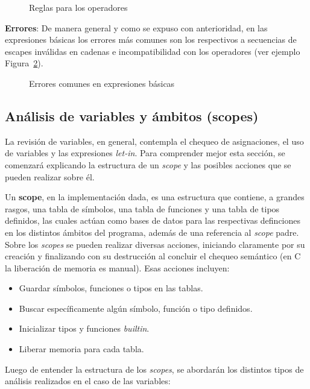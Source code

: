 \documentclass{llncs}
\begin{document}
\begin{figure}[h]
\centering
\caption{Reglas para los operadores}
\label{fig:operadores}
\end{figure}

\textbf{Errores}: De manera general y como se expuso con anterioridad, en las expresiones básicas los errores más comunes son 
los respectivos a secuencias de escapes inválidas en cadenas e incompatibilidad con los operadores (ver ejemplo Figura~\ref{fig:errores_1}).
\begin{figure}[h]
\centering
\caption{Errores comunes en expresiones básicas}
\label{fig:errores_1}
\end{figure}

\subsection{Análisis de variables y ámbitos (scopes)}

La revisión de variables, en general, contempla el chequeo de asignaciones, el uso de variables y
las expresiones \textit{let-in}. Para comprender mejor esta sección, se comenzará explicando la estructura 
de un \textit{scope} y las posibles acciones que se pueden realizar sobre él.

Un \textbf{scope}, en la implementación dada, es una estructura que contiene, a grandes rasgos, una tabla de
símbolos, una tabla de funciones y una tabla de tipos definidos, las cuales actúan como bases de datos para las
respectivas definciones en los distintos ámbitos del programa, además de una referencia al \textit{scope} padre.
Sobre los \textit{scopes} se pueden realizar diversas  acciones, iniciando claramente por su creación y
finalizando con su destrucción al concluir el chequeo semántico (en C la liberación de memoria es manual). Esas
acciones incluyen:
\begin{itemize}
    \item Guardar símbolos, funciones o tipos en las tablas.
    \item Buscar específicamente algún símbolo, función o tipo definidos.
    \item Inicializar tipos y funciones \textit{builtin}.
    \item Liberar memoria para cada tabla.
\end{itemize}

Luego de entender la estructura de los \textit{scopes}, se abordarán los distintos tipos de análisis realizados en el caso 
de las variables: 
\end{document}
